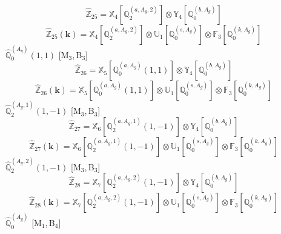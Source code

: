 \documentclass[fleqn,10pt,landscape]{article}
\begin{document}
\begin{itemize}
\begin{dmath*}
\hat{\mathbb{Z}}_{25}=\mathbb{X}_{4}[\mathbb{Q}_{2}^{(a,A_{g},2)}] \otimes\mathbb{Y}_{4}[\mathbb{Q}_{0}^{(b,A_{g})}]
\end{dmath*}
\begin{dmath*}
\hat{\mathbb{Z}}_{25}(\bm{k})=\mathbb{X}_{4}[\mathbb{Q}_{2}^{(a,A_{g},2)}] \otimes\mathbb{U}_{1}[\mathbb{Q}_{0}^{(s,A_{g})}] \otimes\mathbb{F}_{3}[\mathbb{Q}_{0}^{(k,A_{g})}]
\end{dmath*}
\vspace{4mm}
\noindent {} $\,\,\,\hat{\mathbb{Q}}_{0}^{(A_{g})}(1,1)$ [M$_{3}$,\,B$_{3}$]
\begin{dmath*}
\hat{\mathbb{Z}}_{26}=\mathbb{X}_{5}[\mathbb{Q}_{0}^{(a,A_{g})}(1,1)] \otimes\mathbb{Y}_{4}[\mathbb{Q}_{0}^{(b,A_{g})}]
\end{dmath*}
\begin{dmath*}
\hat{\mathbb{Z}}_{26}(\bm{k})=\mathbb{X}_{5}[\mathbb{Q}_{0}^{(a,A_{g})}(1,1)] \otimes\mathbb{U}_{1}[\mathbb{Q}_{0}^{(s,A_{g})}] \otimes\mathbb{F}_{3}[\mathbb{Q}_{0}^{(k,A_{g})}]
\end{dmath*}
\vspace{4mm}
\noindent {} $\,\,\,\hat{\mathbb{Q}}_{2}^{(A_{g},1)}(1,-1)$ [M$_{3}$,\,B$_{3}$]
\begin{dmath*}
\hat{\mathbb{Z}}_{27}=\mathbb{X}_{6}[\mathbb{Q}_{2}^{(a,A_{g},1)}(1,-1)] \otimes\mathbb{Y}_{4}[\mathbb{Q}_{0}^{(b,A_{g})}]
\end{dmath*}
\begin{dmath*}
\hat{\mathbb{Z}}_{27}(\bm{k})=\mathbb{X}_{6}[\mathbb{Q}_{2}^{(a,A_{g},1)}(1,-1)] \otimes\mathbb{U}_{1}[\mathbb{Q}_{0}^{(s,A_{g})}] \otimes\mathbb{F}_{3}[\mathbb{Q}_{0}^{(k,A_{g})}]
\end{dmath*}
\vspace{4mm}
\noindent {} $\,\,\,\hat{\mathbb{Q}}_{2}^{(A_{g},2)}(1,-1)$ [M$_{3}$,\,B$_{3}$]
\begin{dmath*}
\hat{\mathbb{Z}}_{28}=\mathbb{X}_{7}[\mathbb{Q}_{2}^{(a,A_{g},2)}(1,-1)] \otimes\mathbb{Y}_{4}[\mathbb{Q}_{0}^{(b,A_{g})}]
\end{dmath*}
\begin{dmath*}
\hat{\mathbb{Z}}_{28}(\bm{k})=\mathbb{X}_{7}[\mathbb{Q}_{2}^{(a,A_{g},2)}(1,-1)] \otimes\mathbb{U}_{1}[\mathbb{Q}_{0}^{(s,A_{g})}] \otimes\mathbb{F}_{3}[\mathbb{Q}_{0}^{(k,A_{g})}]
\end{dmath*}
\vspace{4mm}
\noindent {} $\,\,\,\hat{\mathbb{Q}}_{0}^{(A_{g})}$ [M$_{1}$,\,B$_{4}$]

\end{itemize}
\end{document}

